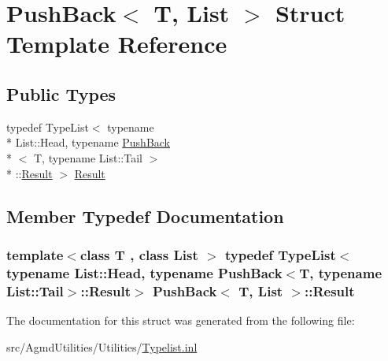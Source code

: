 \hypertarget{struct_push_back}{\section{Push\+Back$<$ T, List $>$ Struct Template Reference}
\label{struct_push_back}
}
\subsection*{Public Types}
\begin{DoxyCompactItemize}
\item 
typedef Type\+List$<$ typename \\*
List\+::\+Head, typename \hyperlink{struct_push_back}{Push\+Back}\\*
$<$ T, typename List\+::\+Tail $>$\\*
\+::\hyperlink{struct_push_back_a1f47a1c3bc1a30abdfb3ace4645a44fd}{Result} $>$ \hyperlink{struct_push_back_a1f47a1c3bc1a30abdfb3ace4645a44fd}{Result}
\end{DoxyCompactItemize}


\subsection{Member Typedef Documentation}
\hypertarget{struct_push_back_a1f47a1c3bc1a30abdfb3ace4645a44fd}{
\subsubsection[{Result}]{\setlength{\rightskip}{0pt plus 5cm}template$<$class T , class List $>$ typedef Type\+List$<$typename List\+::\+Head, typename {\bf Push\+Back}$<$T, typename List\+::\+Tail$>$\+::{\bf Result}$>$ {\bf Push\+Back}$<$ T, List $>$\+::{\bf Result}}}\label{struct_push_back_a1f47a1c3bc1a30abdfb3ace4645a44fd}


The documentation for this struct was generated from the following file\+:\begin{DoxyCompactItemize}
\item 
src/\+Agmd\+Utilities/\+Utilities/\hyperlink{_typelist_8inl}{Typelist.\+inl}\end{DoxyCompactItemize}
